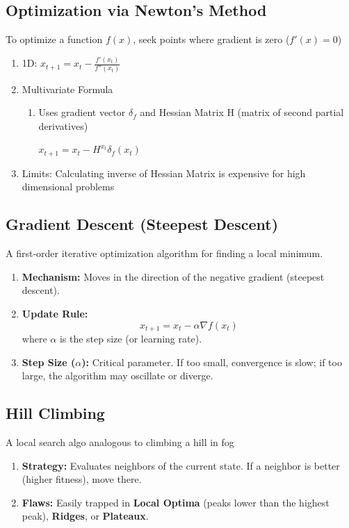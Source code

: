 \documentclass[12pt]{article}
\begin{document}
\subsection{Optimization via Newton's Method}

To optimize a function $f(x)$, seek points where gradient is zero ($f'(x) = 0$)

\begin{enumerate}
    \item 1D: $x_{t+1} = x_t - \frac{f'(x_t)}{f''(x_t)}$
    \item Multivariate Formula
          \begin{enumerate}
              \item Uses gradient vector $\delta_f$ and Hessian Matrix H (matrix of second partial derivatives)

                    $x_{t+1} = x_t - H^{x_t}\delta_f(x_t)$

          \end{enumerate}
    \item Limits: Calculating inverse of Hessian Matrix is expensive for high dimensional problems
\end{enumerate}

\subsection{Gradient Descent (Steepest Descent)}
A first-order iterative optimization algorithm for finding a local minimum.
\begin{enumerate}
    \item \textbf{Mechanism:} Moves in the direction of the negative gradient (steepest descent).

    \item \textbf{Update Rule:}
          \[
              x_{t+1} = x_t - \alpha \nabla f(x_t)
          \]
          where $\alpha$ is the step size (or learning rate).

    \item \textbf{Step Size ($\alpha$):} Critical parameter. If too small, convergence is slow; if too large, the algorithm may oscillate or diverge.
\end{enumerate}


\subsection{Hill Climbing}
A local search algo analogous to climbing a hill in fog
\begin{enumerate}
    \item \textbf{Strategy:} Evaluates neighbors of the current state. If a neighbor is better (higher fitness), move there.

    \item \textbf{Flaws:} Easily trapped in \textbf{Local Optima} (peaks lower than the highest peak), \textbf{Ridges}, or \textbf{Plateaux}.
\end{enumerate}
\end{document}
